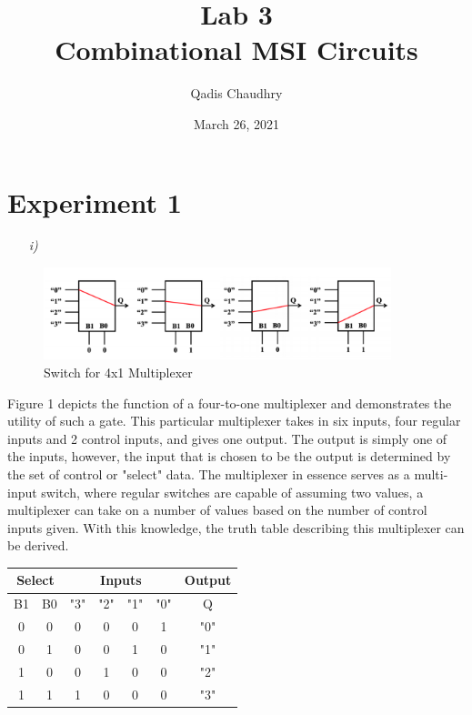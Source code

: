 \documentclass[12pt]{article}
\title{Lab 3 \\ Combinational MSI Circuits}
\author{Qadis Chaudhry}
\date{March 26, 2021}
\begin{document}
\maketitle
\section*{Experiment 1}
\begin{itemize}
    \item[\textit{i)}]
\end{itemize}
\begin{figure}[h]
    \centering
    \includegraphics[width=0.9\textwidth]{Experiment 1 Figure 1.png}
    \caption{Switch for 4x1 Multiplexer}
    \label{fig:Experiment-1-part-1-png}
\end{figure}
\par Figure 1 depicts the function of a four-to-one multiplexer and demonstrates
the utility of such a gate. This particular multiplexer takes in six inputs,
four regular inputs and 2 control inputs, and gives one output. The output is
simply one of the inputs, however, the input that is chosen to be the output is
determined by the set of control or "select" data. The multiplexer in essence
serves as a multi-input switch, where regular switches are capable of assuming
two values, a multiplexer can take on a number of values based on the number of
control inputs given. With this knowledge, the truth table describing this
multiplexer can be derived.
\begin{center}
    \begin{tabular}{cc|cccc|c}
        \toprule
        \multicolumn{2}{c}{Select} & \multicolumn{4}{|c|}{Inputs} & Output \\
        \midrule
        B1 & B0 & "3" & "2" & "1" & "0" & Q \\
        \midrule
        0 & 0 & 0 & 0 & 0 & 1 & "0" \\
        0 & 1 & 0 & 0 & 1 & 0 & "1" \\
        1 & 0 & 0 & 1 & 0 & 0 & "2" \\
        1 & 1 & 1 & 0 & 0 & 0 & "3" \\
        \bottomrule
    \end{tabular}
\end{center}
\end{document}

